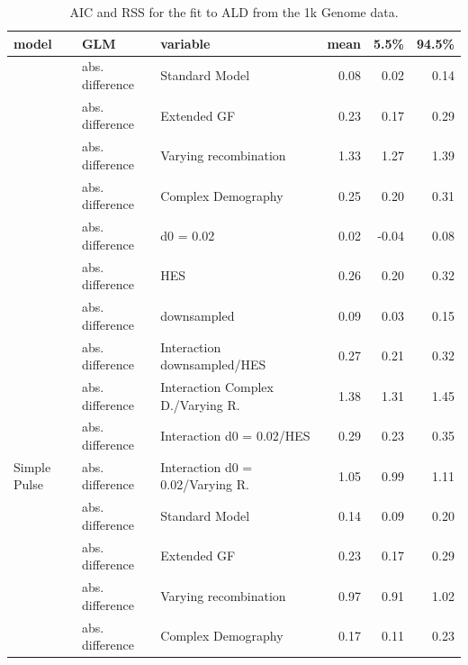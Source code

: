 \documentclass[11pt]{article}
\begin{document}
\begin{table}[H]

\caption{\label{tab:tableSReadl_data_AIC_RSS} AIC and RSS for the fit  to ALD from the 1k Genome data.}

\centering

\begin{tabular}[t]{l|l|l|r|r|r}
\hline
model & GLM & variable & mean & 5.5\% & 94.5\%\\
\hline
 & abs. difference & Standard Model & 0.08 & 0.02 & 0.14\\

 & abs. difference & Extended GF & 0.23 & 0.17 & 0.29\\

 & abs. difference & Varying recombination & 1.33 & 1.27 & 1.39\\

 & abs. difference & Complex Demography & 0.25 & 0.20 & 0.31\\

 & abs. difference & d0 = 0.02 & 0.02 & -0.04 & 0.08\\

 & abs. difference & HES & 0.26 & 0.20 & 0.32\\

 & abs. difference & downsampled & 0.09 & 0.03 & 0.15\\

 & abs. difference & Interaction downsampled/HES & 0.27 & 0.21 & 0.32\\

 & abs. difference & Interaction Complex D./Varying R. & 1.38 & 1.31 & 1.45\\

 & abs. difference & Interaction d0 = 0.02/HES & 0.29 & 0.23 & 0.35\\

\multirow{-11}{*}{\raggedright\arraybackslash Simple Pulse} & abs. difference & Interaction d0 = 0.02/Varying R. & 1.05 & 0.99 & 1.11\\
\cline{1-6}
 & abs. difference & Standard Model & 0.14 & 0.09 & 0.20\\

 & abs. difference & Extended GF & 0.23 & 0.17 & 0.29\\

 & abs. difference & Varying recombination & 0.97 & 0.91 & 1.02\\

 & abs. difference & Complex Demography & 0.17 & 0.11 & 0.23\\


\end{tabular}
\end{table}
\end{document}
